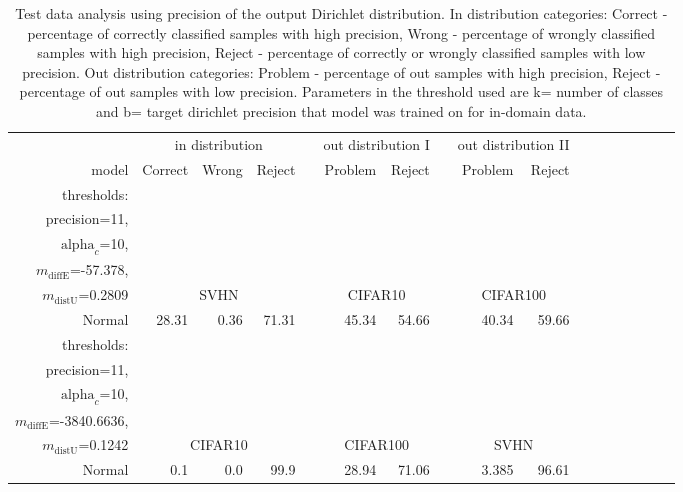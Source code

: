 \begin{table}[ht]
	\centering
	\caption{Test data analysis using precision of the output Dirichlet distribution. In distribution categories: Correct - percentage of correctly classified samples with high precision,
	Wrong - percentage of wrongly classified samples with high precision, Reject - percentage of correctly or wrongly classified samples with low precision. Out distribution categories:
	Problem - percentage of out samples with high precision, Reject - percentage of out samples with low precision. Parameters in the threshold used are k= number of classes and
	b= target dirichlet precision that model was trained on for in-domain data. }
	\begin{tiny}
        \begin{tabular}{@{}rrrrrrrcrrrrcrrrr@{}}
        \toprule
		& \multicolumn{3}{c}{in distribution} & & \multicolumn{2}{c}{out distribution I} & & \multicolumn{2}{c}{out distribution II} \\
		model & Correct & Wrong & Reject & &  Problem & Reject &  & Problem & Reject \\
        \midrule
		thresholds: \\
		precision=11, \\
		$\mathrm{alpha}_c$=10, \\
		$m_{\mathrm{diffE}}$=-57.378, \\
		$m_{\mathrm{distU}}$=0.2809 & \multicolumn{3}{c}{SVHN} & & \multicolumn{2}{c}{CIFAR10} & & \multicolumn{2}{c}{CIFAR100} \\
		Normal & 28.31 & 0.36 & 71.31 & & 45.34 & 54.66 && 40.34 & 59.66 \\
		\midrule
		thresholds: \\
		precision=11, \\
		$\mathrm{alpha}_c$=10, \\
		$m_{\mathrm{diffE}}$=-3840.6636, \\
		$m_{\mathrm{distU}}$=0.1242 & \multicolumn{3}{c}{CIFAR10} & & \multicolumn{2}{c}{CIFAR100} & & \multicolumn{2}{c}{SVHN} \\
		Normal & 0.1 & 0.0 & 99.9 & & 28.94 & 71.06 && 3.385 & 96.61 \\
		\end{tabular}
	\end{tiny}
\label{tab:precision and uncertainty based data analysis - SVHN}
\end{table}